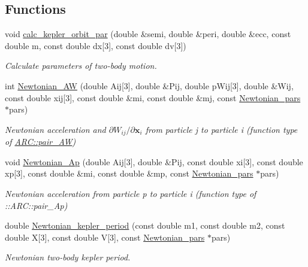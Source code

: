 \subsection*{Functions}
\begin{DoxyCompactItemize}
\item 
void \hyperlink{namespaceNTA_afeafba4c0eba0bd136281e667fe8096d}{calc\+\_\+kepler\+\_\+orbit\+\_\+par} (double \&semi, double \&peri, double \&ecc, const double m, const double dx\mbox{[}3\mbox{]}, const double dv\mbox{[}3\mbox{]})
\begin{DoxyCompactList}\small\item\em Calculate parameters of two-\/body motion. \end{DoxyCompactList}\item 
int \hyperlink{namespaceNTA_aecd205ef07c4302cd04d04218c4426e6}{Newtonian\+\_\+\+AW} (double Aij\mbox{[}3\mbox{]}, double \&Pij, double p\+Wij\mbox{[}3\mbox{]}, double \&Wij, const double xij\mbox{[}3\mbox{]}, const double \&mi, const double \&mj, const \hyperlink{classNTA_1_1Newtonian__pars}{Newtonian\+\_\+pars} $\ast$pars)
\begin{DoxyCompactList}\small\item\em Newtonian acceleration and $\partial W_{ij}/\partial \mathbf{x}_i$ from particle j to particle i (function type of \hyperlink{}{A\+R\+C\+::pair\+\_\+\+AW}) \end{DoxyCompactList}\item 
void \hyperlink{namespaceNTA_a5596f8660861d6e23c0827e381908641}{Newtonian\+\_\+\+Ap} (double Aij\mbox{[}3\mbox{]}, double \&Pij, const double xi\mbox{[}3\mbox{]}, const double xp\mbox{[}3\mbox{]}, const double \&mi, const double \&mp, const \hyperlink{classNTA_1_1Newtonian__pars}{Newtonian\+\_\+pars} $\ast$pars)
\begin{DoxyCompactList}\small\item\em Newtonian acceleration from particle p to particle i (function type of \+::\+A\+R\+C\+::pair\+\_\+\+Ap) \end{DoxyCompactList}\item 
double \hyperlink{namespaceNTA_a809fe56903f4b0cd75feaa9db6a37ded}{Newtonian\+\_\+kepler\+\_\+period} (const double m1, const double m2, const double X\mbox{[}3\mbox{]}, const double V\mbox{[}3\mbox{]}, const \hyperlink{classNTA_1_1Newtonian__pars}{Newtonian\+\_\+pars} $\ast$pars)
\begin{DoxyCompactList}\small\item\em Newtonian two-\/body kepler period. \end{DoxyCompactList}\end{DoxyCompactItemize}


